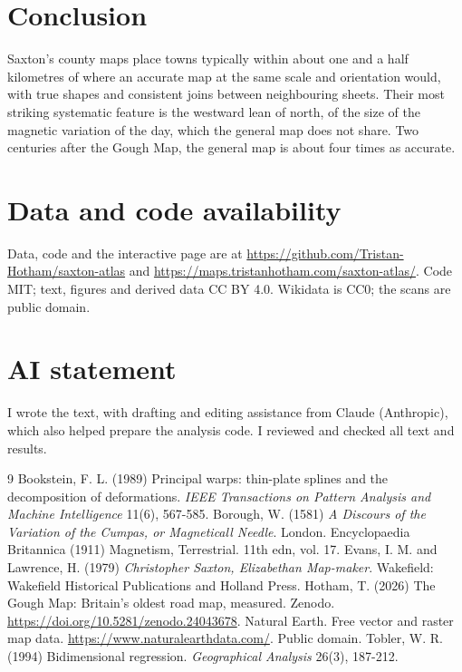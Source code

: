 \documentclass[11pt,a4paper]{article}
\begin{document}
\section{Conclusion}
Saxton's county maps place towns typically within about one and a half kilometres of where an accurate map at the same scale and orientation would, with true shapes and consistent joins between neighbouring sheets. Their most striking systematic feature is the westward lean of north, of the size of the magnetic variation of the day, which the general map does not share. Two centuries after the Gough Map, the general map is about four times as accurate.

\section*{Data and code availability}
Data, code and the interactive page are at \url{https://github.com/Tristan-Hotham/saxton-atlas} and \url{https://maps.tristanhotham.com/saxton-atlas/}. Code MIT; text, figures and derived data CC BY 4.0. Wikidata is CC0; the scans are public domain.

\section*{AI statement}
I wrote the text, with drafting and editing assistance from Claude (Anthropic), which also helped prepare the analysis code. I reviewed and checked all text and results.

\begin{thebibliography}{9}
 Bookstein, F. L. (1989) Principal warps: thin-plate splines and the decomposition of deformations. \emph{IEEE Transactions on Pattern Analysis and Machine Intelligence} 11(6), 567-585.
 Borough, W. (1581) \emph{A Discours of the Variation of the Cumpas, or Magneticall Needle}. London.
 Encyclopaedia Britannica (1911) Magnetism, Terrestrial. 11th edn, vol. 17.
 Evans, I. M. and Lawrence, H. (1979) \emph{Christopher Saxton, Elizabethan Map-maker}. Wakefield: Wakefield Historical Publications and Holland Press.
 Hotham, T. (2026) The Gough Map: Britain's oldest road map, measured. Zenodo. \url{https://doi.org/10.5281/zenodo.24043678}.
 Natural Earth. Free vector and raster map data. \url{https://www.naturalearthdata.com/}. Public domain.
 Tobler, W. R. (1994) Bidimensional regression. \emph{Geographical Analysis} 26(3), 187-212.
\end{thebibliography}
\end{document}
